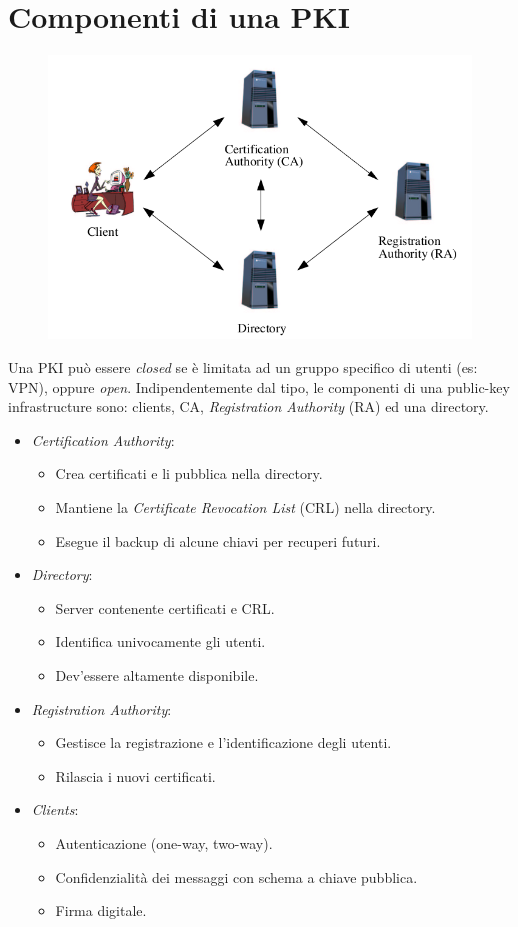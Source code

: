 \documentclass[a4paper, 11pt, twoside, openright, fleqn]{report}
\begin{document}
\section{Componenti di una PKI}
\begin{figure}[htp]
	\centering
	\includegraphics[width=.85\textwidth]{images/PKIComponents}
\end{figure}

\noindent Una PKI può essere \emph{closed} se è limitata ad un gruppo specifico di utenti (es: VPN), oppure \emph{open}. Indipendentemente dal tipo, le componenti di una public-key infrastructure sono: clients, CA, \emph{Registration Authority} (RA) ed una directory.
\begin{itemize}
	\item \emph{Certification Authority}:
	\begin{itemize}
		\item Crea certificati e li pubblica nella directory.
		\item Mantiene la \emph{Certificate Revocation List} (CRL) nella directory.
		\item Esegue il backup di alcune chiavi per recuperi futuri.
	\end{itemize}
	\item \emph{Directory}:
	\begin{itemize}
		\item Server contenente certificati e CRL.
		\item Identifica univocamente gli utenti.
		\item Dev'essere altamente disponibile.
	\end{itemize}
	\item \emph{Registration Authority}:
	\begin{itemize}
		\item Gestisce la registrazione e l'identificazione degli utenti.
		\item Rilascia i nuovi certificati.
	\end{itemize}
	\item \emph{Clients}:
	\begin{itemize}
		\item Autenticazione (one-way, two-way).
		\item Confidenzialità dei messaggi con schema a chiave pubblica.
		\item Firma digitale.
	\end{itemize}
\end{itemize}
\end{document}
